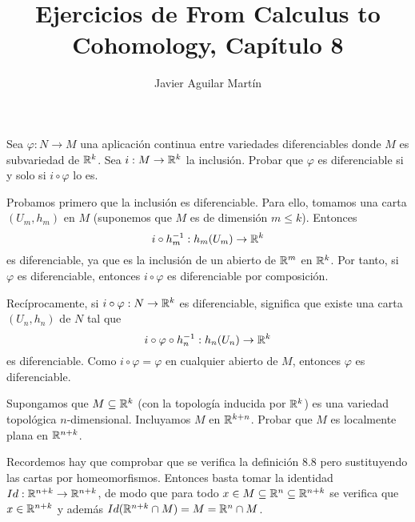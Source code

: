 \documentclass[twoside]{article}
\begin{document}
\title{Ejercicios de From Calculus to Cohomology, Capítulo 8}
\author{Javier Aguilar Martín}
\maketitle



\begin{ejercicio}{8.2}
Sea $\varphi:N\to M$ una aplicación continua entre variedades diferenciables donde $M$ es subvariedad de $\mathbb{R}^k$. Sea $i:M\to \mathbb{R}^k$ la inclusión. Probar que $\varphi$ es diferenciable si y solo si $i\circ\varphi$ lo es.
\end{ejercicio}
\begin{solucion}
Probamos primero que la inclusión es diferenciable. Para ello, tomamos una carta $(U_m, h_m)$ en $M$ (suponemos que $M$ es de dimensión $m\leq k$). Entonces
\[
 i\circ h_m^{-1}: h_m(U_m)\to \mathbb{R}^k
\]
es diferenciable, ya que es la inclusión de un abierto de $\mathbb{R}^m$ en $\mathbb{R}^k$. Por tanto, si $\varphi$ es diferenciable, entonces $i\circ\varphi$ es diferenciable por composición. 

Recíprocamente, si $i\circ\varphi:N\to \mathbb{R}^k$ es diferenciable, significa que existe una carta $(U_n,h_n)$ de $N$ tal que
\[
i\circ\varphi\circ h_n^{-1}:h_n(U_n)\to\mathbb{R}^k
\]
es diferenciable. Como $i\circ\varphi=\varphi$ en cualquier abierto de $M$, entonces $\varphi$ es diferenciable.
\end{solucion}
\newpage

\begin{ejercicio}{8.3}
Supongamos que $M\subseteq\mathbb{R}^k$ (con la topología inducida por $\mathbb{R}^k$) es una variedad topológica $n$-dimensional. Incluyamos $M$ en $\mathbb{R}^{k+n}$. Probar que $M$ es localmente plana en $\mathbb{R}^{n+k}$.
\end{ejercicio}
\begin{solucion}
Recordemos hay que comprobar que se verifica la definición 8.8 pero sustituyendo las cartas por homeomorfismos. Entonces basta tomar la identidad $Id:\mathbb{R}^{n+k}\to\mathbb{R}^{n+k}$, de modo que para todo $x\in M\subseteq\mathbb{R}^n\subseteq\mathbb{R}^{n+k}$ se verifica que $x\in\mathbb{R}^{n+k}$ y además $Id(\mathbb{R}^{n+k}\cap M)=M=\mathbb{R}^n\cap M$.
\end{solucion}
\newpage
\end{document}

